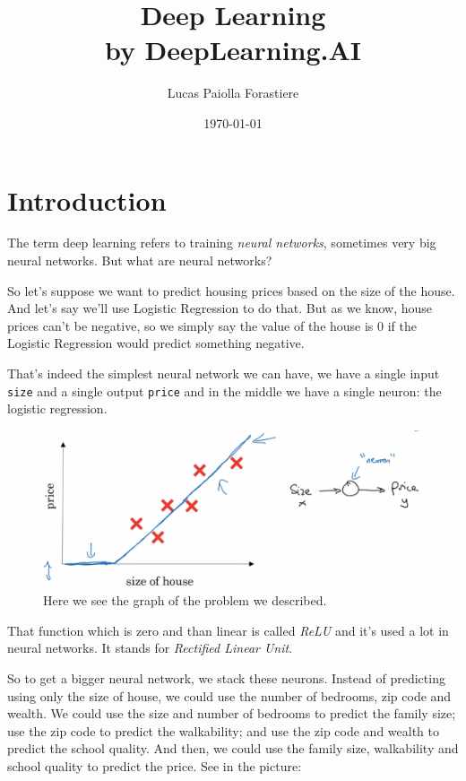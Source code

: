 \documentclass[12pt, a4paper, oneside]{book}
\title{Deep Learning\\\small{by DeepLearning.AI}}
\date{\today}
\author{Lucas Paiolla Forastiere}
\begin{document}
\maketitle
\tableofcontents
\newpage


\chapter{Introduction}%
\label{cha:introduction}

The term deep learning refers to training \textit{neural networks}, sometimes
very big neural networks. But what are neural networks?

So let's suppose we want to predict housing prices based on the size of the
house. And let's say we'll use Logistic Regression to do that. But as we know,
house prices can't be negative, so we simply say the value of the house is $0$
if the Logistic Regression would predict something negative.

That's indeed the simplest neural network we can have, we have a single input
\texttt{size} and a single output \texttt{price} and in the middle we have a
single neuron: the logistic regression.

\begin{figure}[h]
\centering
\includegraphics[scale=0.6]{Res/housing_logistic_regression.png}
\caption{Here we see the graph of the problem we described.}
\label{housing_logistic_regression.png}
\end{figure}

That function which is zero and than linear is called \textit{ReLU} and it's
used a lot in neural networks. It stands for \textit{Rectified Linear Unit}.

So to get a bigger neural network, we stack these neurons. Instead of predicting
using only the size of house, we could use the number of bedrooms, zip code and
wealth. We could use the size and number of bedrooms to predict the family size;
use the zip code to predict the walkability; and use the zip code and wealth to
predict the school quality. And then, we could use the family size, walkability
and school quality to predict the price. See in the picture:
\end{document}
